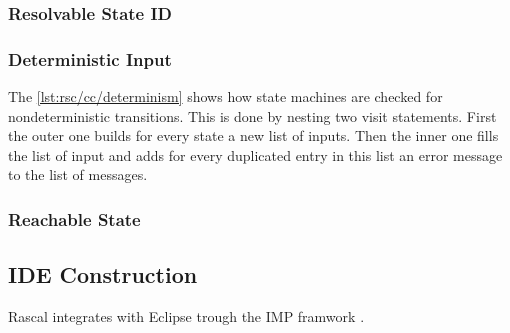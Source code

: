 

\subsubsection{Resolvable State ID}



\subsubsection{Deterministic Input}

The \autoref{lst:rsc/cc/determinism} shows how state machines are checked for nondeterministic transitions.
This is done by nesting two visit statements.
First the outer one builds for every state a new list of inputs.
Then the inner one fills the list of input and adds for every duplicated entry in this list an error message to the list of messages.



\subsubsection{Reachable State}



\subsection{IDE Construction}

Rascal integrates with Eclipse trough the IMP framwork \cite{van2011rascal}.




